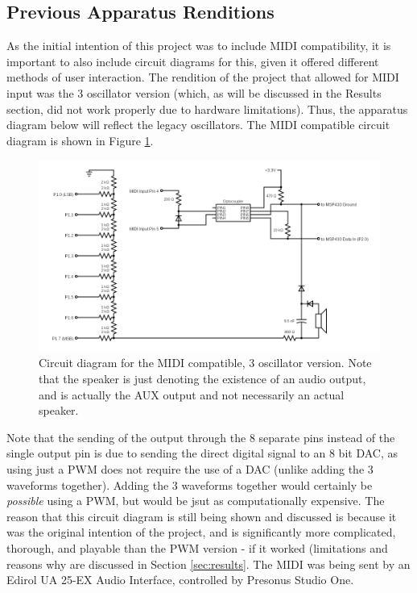 \subsection{Previous Apparatus Renditions}\label{subsec:previous-apparatus-renditions}

As the initial intention of this project was to include MIDI compatibility, it is important to also include circuit diagrams for this, given it offered different methods of user interaction.
The rendition of the project that allowed for MIDI input was the 3 oscillator version (which, as will be discussed in the Results section, did not work properly due to hardware limitations).
Thus, the apparatus diagram below will reflect the legacy oscillators. The MIDI compatible circuit diagram is shown in Figure \ref{fig:3oscillatordiagram}. 

\begin{figure}
    \centering
    \includegraphics[width = 0.98 \textwidth]{midicircuit.png}
    \caption{Circuit diagram for the MIDI compatible, 3 oscillator version. Note that the speaker is just denoting the existence of an audio output, and is actually the AUX output and not necessarily an actual speaker.}
    \label{fig:3oscillatordiagram}
\end{figure}

Note that the sending of the output through the 8 separate pins instead of the single output pin is due to sending the direct digital signal to an 8 bit DAC, as using just a PWM does not require the use of a DAC (unlike adding the 3 waveforms together). 
Adding the 3 waveforms together would certainly be \textit{possible} using a PWM, but would be jsut as computationally expensive. 
The reason that this circuit diagram is still being shown and discussed is because it was the original intention of the project, and is significantly more complicated, thorough, and playable than the PWM version - if it worked (limitations and reasons why are discussed in Section \ref{sec:results}. 
The MIDI was being sent by an Edirol UA 25-EX Audio Interface, controlled by Presonus Studio One. 

